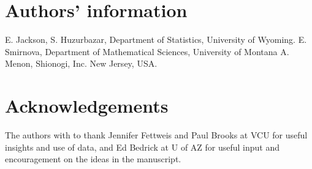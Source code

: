 \documentclass[doublespacing]{bmcart}
\begin{document}
\begin{backmatter}
   
\section*{Authors' information}
E. Jackson, S. Huzurbazar, Department of Statistics, University of Wyoming.
E. Smirnova, Department of Mathematical Sciences, University of Montana
A. Menon, Shionogi, Inc. New Jersey, USA.

\section*{Acknowledgements}
The authors with to thank Jennifer Fettweis and Paul Brooks at VCU for useful insights and use of data, and Ed Bedrick at U of AZ for useful input and encouragement on the ideas in the manuscript.





\end{backmatter}
\end{document}
